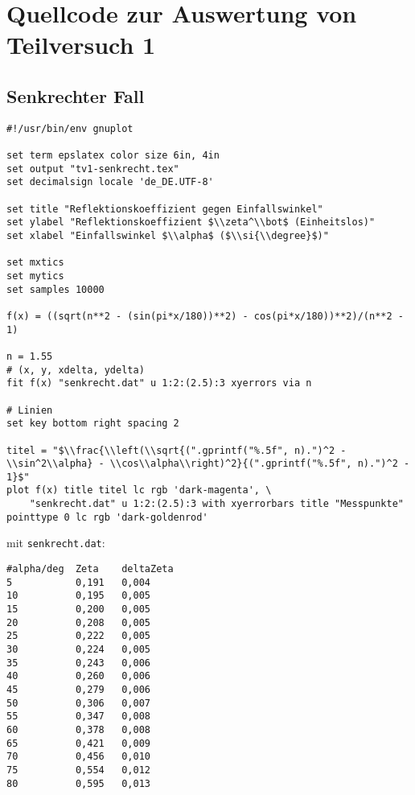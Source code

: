 \section{\gnuplot{} Quellcode zur Auswertung von Teilversuch 1}
    \subsection{Senkrechter Fall}
    \label{appdx:tv1-senk-gp}
    {  
        \renewcommand{\fcolorbox}[4][]{#4}
        \begin{verbatim}
#!/usr/bin/env gnuplot

set term epslatex color size 6in, 4in
set output "tv1-senkrecht.tex"
set decimalsign locale 'de_DE.UTF-8'

set title "Reflektionskoeffizient gegen Einfallswinkel"
set ylabel "Reflektionskoeffizient $\\zeta^\\bot$ (Einheitslos)"
set xlabel "Einfallswinkel $\\alpha$ ($\\si{\\degree}$)"

set mxtics
set mytics
set samples 10000

f(x) = ((sqrt(n**2 - (sin(pi*x/180))**2) - cos(pi*x/180))**2)/(n**2 - 1)

n = 1.55
# (x, y, xdelta, ydelta)
fit f(x) "senkrecht.dat" u 1:2:(2.5):3 xyerrors via n

# Linien
set key bottom right spacing 2

titel = "$\\frac{\\left(\\sqrt{(".gprintf("%.5f", n).")^2 - \\sin^2\\alpha} - \\cos\\alpha\\right)^2}{(".gprintf("%.5f", n).")^2 - 1}$"
plot f(x) title titel lc rgb 'dark-magenta', \
    "senkrecht.dat" u 1:2:(2.5):3 with xyerrorbars title "Messpunkte" pointtype 0 lc rgb 'dark-goldenrod'
        \end{verbatim}
    }
    mit \texttt{senkrecht.dat}:
    \begin{multicols}{2}
        \begin{verbatim}
#alpha/deg  Zeta    deltaZeta
5           0,191   0,004
10          0,195   0,005
15          0,200   0,005
20          0,208   0,005
25          0,222   0,005
30          0,224   0,005
35          0,243   0,006
40          0,260   0,006
45          0,279   0,006
50          0,306   0,007
55          0,347   0,008
60          0,378   0,008
65          0,421   0,009
70          0,456   0,010
75          0,554   0,012
80          0,595   0,013
        \end{verbatim}
    \end{multicols}
